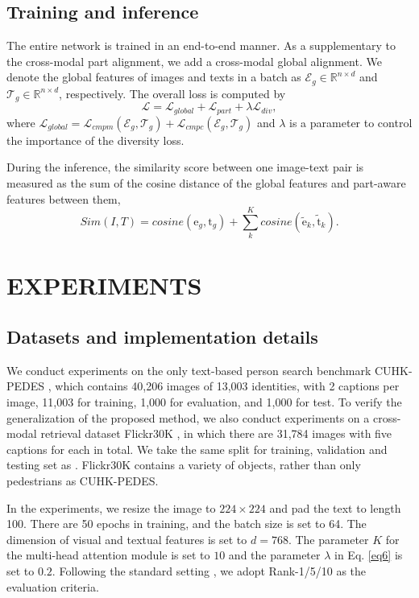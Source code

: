\documentclass{article}
\begin{document}
\subsection{Training and inference}
The entire network is trained in an end-to-end manner. As a supplementary to the cross-modal part alignment, we add a cross-modal global alignment. We denote the global features of images and texts in a batch as $\bm{\mathrm{\mathcal{E}}}_g \in \mathbb{R}^{n\times d}$ and $\bm{\mathrm{\mathcal{T}}}_g \in \mathbb{R}^{n\times d}$, respectively. The overall loss is computed by
\begin{equation}
\mathcal{L}=\mathcal{L}_{global}+\mathcal{L}_{part}+\lambda\mathcal{L}_{div},
\label{eq6}
\end{equation}
where $
\mathcal{L}_{global}=\mathcal{L}_{cmpm}(\bm{\mathrm{\mathcal{E}}}_g,\bm{\mathrm{\mathcal{T}}}_g)+\mathcal{L}_{cmpc}(\bm{\mathrm{\mathcal{E}}}_g,\bm{\mathrm{\mathcal{T}}}_g)$ and 
$\lambda$ is a parameter to control the importance of the diversity loss.
\par
During the inference, the similarity score between one image-text pair is measured as the sum of the cosine distance of the global features and part-aware features between them,
\begin{equation}
Sim(I,T)=cosine(\bm{\mathrm{e}}_g,\bm{\mathrm{t}}_g)+\sum_k^Kcosine(\bm{\tilde{\mathrm{e}}}_k,\bm{\tilde{\mathrm{t}}}_k).
\end{equation}
\section{EXPERIMENTS}
\subsection{Datasets and implementation details}
We conduct experiments on the only text-based person search benchmark CUHK-PEDES \cite{li2017person}, which contains 40,206 images of 13,003 identities, with 2 captions per image, 11,003 for training, 1,000 for evaluation, and 1,000 for test. To verify the generalization of the proposed method, we also conduct experiments on a cross-modal retrieval dataset Flickr30K \cite{young2014image},  in which there are 31,784 images with five captions for each in total. We take the same split for training, validation and testing set as \cite{karpathy2015deep}. Flickr30K contains a variety of objects, rather than only pedestrians as CUHK-PEDES. \par
In the experiments, we resize the image to $224\times224$ and pad the text to length 100. There are 50 epochs in training, and the batch size is set to 64. The dimension of visual and textual features is set to $d=768$. The parameter $K$ for the multi-head attention module is set to $10$ and the parameter $\lambda$ in Eq. \ref{eq6} is set to $0.2$. Following the standard setting \cite{wang2020vitaa}, we adopt Rank-1/5/10 as the evaluation criteria.
\end{document}
